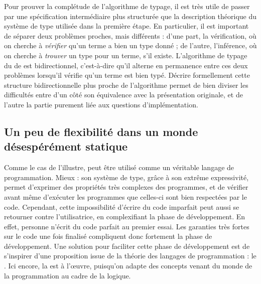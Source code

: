 Pour prouver la complétude de l’algorithme de typage, il est très utile de
passer par une spécification intermédiaire plus structurée que la description
théorique du système de type utilisée dans la première étape.
En particulier, il est important de séparer deux problèmes proches, mais
différents :
d'une part, la vérification, où on cherche à \emph{vérifier}
qu’un terme a bien un type
donné ; de l’autre, l’inférence, où on cherche à \emph{trouver}
un type pour un terme, s'il existe.
L’algorithme de typage du  de  est bidirectionnel,
c'est-à-dire qu’il alterne en permanence entre ces deux problèmes
lorsqu’il vérifie qu’un terme est bien typé.
Décrire formellement cette structure bidirectionnelle plus proche de l’algorithme
permet de bien diviser les difficultés entre d’un côté
son équivalence avec la présentation
originale, et de l’autre la partie purement liée aux questions d’implémentation.

\subsection{Un peu de flexibilité dans un monde désespérément statique}
\label{sec:intro-graduel}

Comme le cas de  l’illustre,  peut être utilisé comme un véritable langage
de programmation. Mieux : son système de type, grâce à son extrême expressivité, 
permet d’exprimer des propriétés très complexes des programmes, et de vérifier
avant même d’exécuter les programmes que celles-ci sont bien respectées par le code.
Cependant, cette impossibilité d’écrire du code imparfait peut aussi se retourner contre l’utilisatrice, en complexifiant la phase de développement.
En effet, personne n’écrit du code parfait au premier essai. Les garanties très
fortes sur le code une fois finalisé compliquent donc 
fortement la phase de développement.
Une solution pour faciliter cette phase de développement
est de s’inspirer d’une proposition issue de la théorie des langages de
programmation : le . Ici encore, la 
est à l’œuvre, puisqu’on adapte des concepts venant du monde de la programmation
au cadre de la logique.

